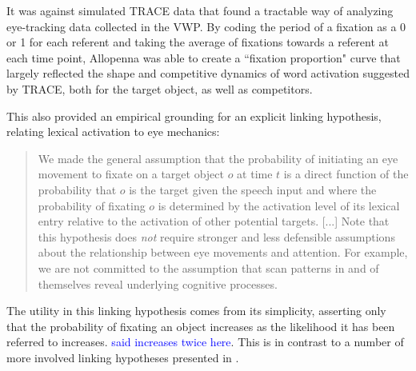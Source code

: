 \documentclass{article}
\providecommand{\cn}[1]{\textcolor{blue}{#1}}
\begin{document}
It was against simulated TRACE data that \citet{allopenna1998tracking} found a tractable way of analyzing eye-tracking data collected in the VWP.  By coding the period of a fixation as a 0 or 1 for each referent and taking the average of fixations towards a referent at each time point, Allopenna was able to create a ``fixation proportion" curve that largely reflected the shape and competitive dynamics of word activation suggested by TRACE, both for the target object, as well as competitors. 

This also provided an empirical grounding for an explicit linking hypothesis, relating lexical activation to eye mechanics:

\begin{quote}
We made the general assumption that the probability of initiating an eye movement to fixate on a target object $o$ at time $t$ is a direct function of the probability that $o$ is the target given the speech input and where the probability of fixating $o$ is determined by the activation level of its lexical entry relative to the activation of other potential targets. [...] Note that this hypothesis does \emph{not} require stronger and less defensible assumptions about the relationship between eye  movements and attention. For example, we are not committed to the assumption that scan patterns in and of themselves reveal underlying cognitive processes.
\end{quote}

The utility in this linking hypothesis comes from its simplicity, asserting only that the probability of fixating an object increases as the likelihood it has been referred to increases. \cn{said increases twice here}. This is in contrast to a number of more involved linking hypotheses presented in \citep{Magnuson2019}.
\end{document}
